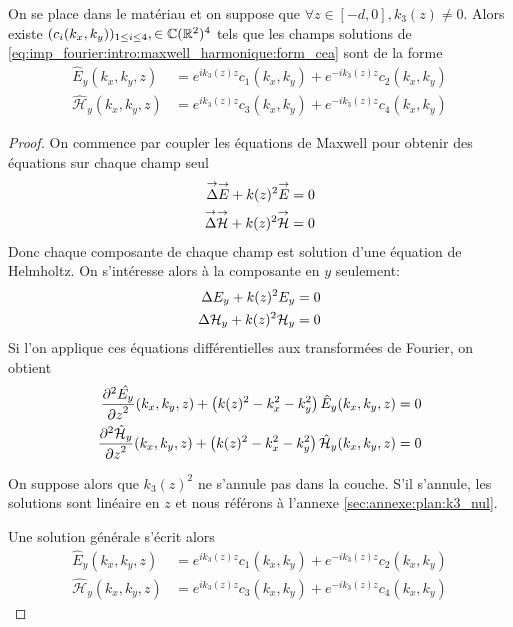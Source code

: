     \begin{prop}
        On se place dans le matériau et on suppose que \(\forall z \in [-d,0], k_3(z) \not = 0\).
        Alors existe \((c_i(k_x,k_y))_{1\le i \le4}, \in \CC(\RR^2)^4\) tels que les champs solutions de \ref{eq:imp_fourier:intro:maxwell_harmonique:form_cea} sont de la forme
        \begin{align*}
            \hat{E}_y(k_x,k_y,z) & = e^{ik_3(z)z}c_1(k_x,k_y) + e^{-ik_3(z)z}c_2(k_x,k_y)
            \\
            \hat{\mathcal{H}}_y(k_x,k_y,z) & = e^{ik_3(z)z}c_3(k_x,k_y) + e^{-ik_3(z)z}c_4(k_x,k_y)
        \end{align*}
    \end{prop}

    \begin{proof}
      On commence par coupler les équations de Maxwell pour obtenir des équations sur chaque champ seul
      \begin{align*}
          \vlapl{\vE} + k(z)^2 \vE & = 0
          \\
          \vlapl{\vH} + k(z)^2 \vH & = 0
      \end{align*}
      Donc chaque composante de chaque champ est solution d'une équation de Helmholtz. On s’intéresse alors à la composante en \(y\) seulement:
      \begin{align*}
          \lapl{E_y} + k(z)^2 E_y & = 0
          \\
          \lapl{\mathcal{H}_y} + k(z)^2 \mathcal{H}_y & = 0
      \end{align*}
      Si l'on applique ces équations différentielles aux transformées de Fourier, on obtient
      \begin{align*}
          \ddr[2]{z}{\hat{E_y}}(k_x,k_y,z) + \left( k(z)^2 - k_x^2 - k_y^2\right) \hat{E}_y(k_x,k_y,z) & = 0
          \\
          \ddr[2]{z}{\hat{\mathcal{H}}_y}(k_x,k_y,z) + \left( k(z)^2 - k_x^2 - k_y^2\right) \hat{\mathcal{H}}_y(k_x,k_y,z) & = 0
      \end{align*}

      On suppose alors que \(k_3(z)^2\) ne s'annule pas dans la couche. S'il s'annule, les solutions sont linéaire en \(z\) et nous référons à l'annexe \ref{sec:annexe:plan:k3_nul}.

      Une solution générale s'écrit alors
      \begin{align*}
          \hat{E}_y(k_x,k_y,z) & = e^{ik_3(z)z}c_1(k_x,k_y) + e^{-ik_3(z)z}c_2(k_x,k_y)
          \\
          \hat{\mathcal{H}}_y(k_x,k_y,z) & = e^{ik_3(z)z}c_3(k_x,k_y) + e^{-ik_3(z)z}c_4(k_x,k_y)
      \end{align*}
    \end{proof}

